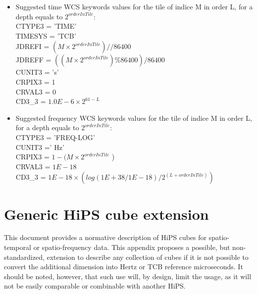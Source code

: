 \documentclass[11pt,a4paper]{ivoa}
\begin{document}
\begin{itemize}

\item Suggested time WCS keywords values for the tile of indice M in order L, for a depth equals to $2^{orderInTile}$:\\
{\ttfamily
CTYPE3   = 'TIME'\\
TIMESYS = 'TCB'\\
JDREFI    = $(M \times 2^{orderInTile}) // 86400$\\
JDREFF   = $((M \times 2^{orderInTile}) \% 86400) / 86400$\\
CUNIT3   = 's'\\
CRPIX3   = 1\\
CRVAL3  = 0\\
CD3\_3    = $1.0E-6 \times 2^{61 - L}$
}
\item Suggested frequency WCS keywords values for the tile of indice M in order L, for a depth equals to $2^{orderInTile}$:\\
{\ttfamily
CTYPE3  = 'FREQ-LOG'\\
CUNIT3  =' Hz'\\
CRPIX3  = $1 - ( M \times 2^{orderInTile}$ )\\
CRVAL3 = $1E-18$\\
CD3\_3   = $1E-18 \times ( log(1E+38/1E-18) / 2^{(L+orderInTile)} )$
}
\end{itemize}


\section{Generic HiPS cube extension}
\label{sec:generic}

This document provides a normative description of HiPS cubes for spatio-temporal or spatio-frequency data. This appendix proposes a possible, but non-standardized, extension to describe any collection of cubes if it is not possible to convert the additional dimension into Hertz or TCB reference microseconds. It should be noted, however, that such use will, by design, limit the usage, as it will not be easily comparable or combinable with another HiPS.
\end{document}
